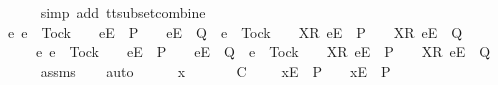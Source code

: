 \begin{isabellebody}
\ \ \ \ \isamarkupfalse%
\ {\isacharparenleft}simp\ add{\isacharcolon}\ tt{\isacharunderscore}subset{\isacharunderscore}combine{\isacharparenright}\isanewline
\ \ \isamarkupfalse%
\ \isamarkupfalse%
\ {\isachardoublequoteopen}{\isacharbraceleft}e{\isachardot}\ e\ {\isasymnoteq}\ Tock\ {\isasymand}\ {\isasymrho}{\isacharprime}{\isacharprime}\ {\isacharat}\ {\isacharbrackleft}{\isacharbrackleft}e{\isacharbrackright}\isactrlsub E{\isacharbrackright}\ {\isasymin}\ P\ {\isasymand}\ {\isasymrho}{\isacharprime}{\isacharprime}\ {\isacharat}\ {\isacharbrackleft}{\isacharbrackleft}e{\isacharbrackright}\isactrlsub E{\isacharbrackright}\ {\isasymin}\ Q\ {\isasymor}\ e\ {\isacharequal}\ Tock\ {\isasymand}\ {\isasymrho}{\isacharprime}{\isacharprime}\ {\isacharat}\ {\isacharbrackleft}{\isacharbrackleft}X{\isacharprime}{\isacharbrackright}\isactrlsub R{\isacharcomma}\ {\isacharbrackleft}e{\isacharbrackright}\isactrlsub E{\isacharbrackright}\ {\isasymin}\ P\ {\isasymand}\ {\isasymrho}{\isacharprime}{\isacharprime}\ {\isacharat}\ {\isacharbrackleft}{\isacharbrackleft}X{\isacharprime}{\isacharbrackright}\isactrlsub R{\isacharcomma}\ {\isacharbrackleft}e{\isacharbrackright}\isactrlsub E{\isacharbrackright}\ {\isasymin}\ Q{\isacharbraceright}\isanewline
\ \ \ \ {\isasymsubseteq}\ {\isacharbraceleft}e{\isachardot}\ e\ {\isasymnoteq}\ Tock\ {\isasymand}\ {\isasymrho}{\isacharprime}\ {\isacharat}\ {\isacharbrackleft}{\isacharbrackleft}e{\isacharbrackright}\isactrlsub E{\isacharbrackright}\ {\isasymin}\ P\ {\isasymand}\ {\isasymrho}{\isacharprime}\ {\isacharat}\ {\isacharbrackleft}{\isacharbrackleft}e{\isacharbrackright}\isactrlsub E{\isacharbrackright}\ {\isasymin}\ Q\ {\isasymor}\ e\ {\isacharequal}\ Tock\ {\isasymand}\ {\isasymrho}{\isacharprime}\ {\isacharat}\ {\isacharbrackleft}{\isacharbrackleft}X{\isacharbrackright}\isactrlsub R{\isacharcomma}\ {\isacharbrackleft}e{\isacharbrackright}\isactrlsub E{\isacharbrackright}\ {\isasymin}\ P\ {\isasymand}\ {\isasymrho}{\isacharprime}\ {\isacharat}\ {\isacharbrackleft}{\isacharbrackleft}X{\isacharbrackright}\isactrlsub R{\isacharcomma}\ {\isacharbrackleft}e{\isacharbrackright}\isactrlsub E{\isacharbrackright}\ {\isasymin}\ Q{\isacharbraceright}{\isachardoublequoteclose}\isanewline
\ \ \ \ \isamarkupfalse%
\ {\isasymsigma}{\isacharunderscore}assms\isanewline
\ \ \isamarkupfalse%
\ auto\isanewline
\ \ \ \ \isamarkupfalse%
\ x\isanewline
\ \ \ \ \isamarkupfalse%
\ {\isachardoublequoteopen}{\isasymrho}{\isacharprime}\ {\isasymsubseteq}\isactrlsub C\ {\isasymrho}{\isacharprime}{\isacharprime}\ {\isasymLongrightarrow}\ {\isasymrho}{\isacharprime}{\isacharprime}\ {\isacharat}\ {\isacharbrackleft}{\isacharbrackleft}x{\isacharbrackright}\isactrlsub E{\isacharbrackright}\ {\isasymin}\ P\ {\isasymLongrightarrow}\ {\isasymrho}{\isacharprime}\ {\isacharat}\ {\isacharbrackleft}{\isacharbrackleft}x{\isacharbrackright}\isactrlsub E{\isacharbrackright}\ {\isasymin}\ P{\isachardoublequoteclose}\isanewline

\end{isabellebody}

